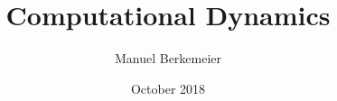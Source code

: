 \documentclass[11pt]{report}
\title{Computational Dynamics}
\author{Manuel Berkemeier}
\date{October 2018}
\begin{document}
\nocite{*}
\maketitle








\end{document}
